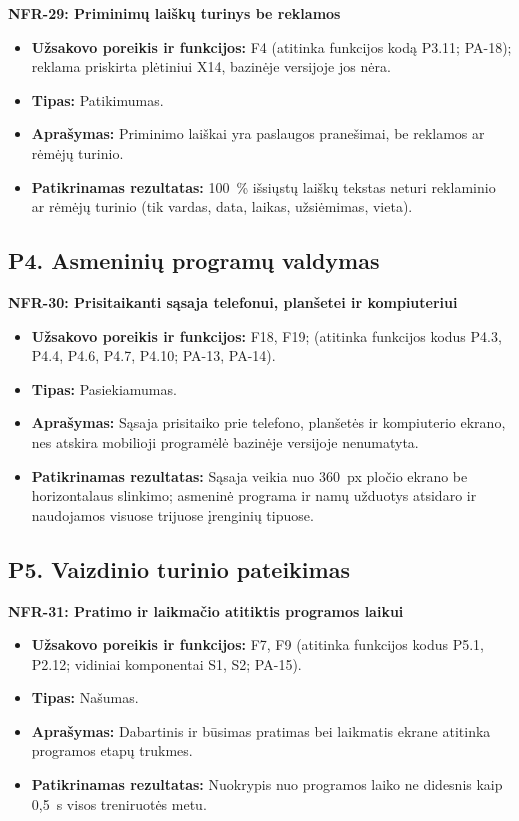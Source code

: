 \noindent\textbf{NFR-29: Priminimų laiškų turinys be reklamos}
\begin{itemize}
    \item \textbf{Užsakovo poreikis ir funkcijos:} F4 (atitinka funkcijos kodą P3.11; PA-18); reklama priskirta plėtiniui X14, bazinėje versijoje jos nėra.
    \item \textbf{Tipas:} Patikimumas.
    \item \textbf{Aprašymas:} Priminimo laiškai yra paslaugos pranešimai, be reklamos ar rėmėjų turinio.
    \item \textbf{Patikrinamas rezultatas:} 100~\% išsiųstų laiškų tekstas neturi reklaminio ar rėmėjų turinio (tik vardas, data, laikas, užsiėmimas, vieta).
\end{itemize}

\subsection{P4. Asmeninių programų valdymas}

\noindent\textbf{NFR-30: Prisitaikanti sąsaja telefonui, planšetei ir kompiuteriui}
\begin{itemize}
    \item \textbf{Užsakovo poreikis ir funkcijos:} F18, F19; (atitinka funkcijos kodus P4.3, P4.4, P4.6, P4.7, P4.10; PA-13, PA-14).
    \item \textbf{Tipas:} Pasiekiamumas.
    \item \textbf{Aprašymas:} Sąsaja prisitaiko prie telefono, planšetės ir kompiuterio ekrano, nes atskira mobilioji programėlė bazinėje versijoje nenumatyta.
    \item \textbf{Patikrinamas rezultatas:} Sąsaja veikia nuo 360~px pločio ekrano be horizontalaus slinkimo; asmeninė programa ir namų užduotys atsidaro ir naudojamos visuose trijuose įrenginių tipuose.
\end{itemize}

\subsection{P5. Vaizdinio turinio pateikimas}

\noindent\textbf{NFR-31: Pratimo ir laikmačio atitiktis programos laikui}
\begin{itemize}
    \item \textbf{Užsakovo poreikis ir funkcijos:} F7, F9 (atitinka funkcijos kodus P5.1, P2.12; vidiniai komponentai S1, S2; PA-15).
    \item \textbf{Tipas:} Našumas.
    \item \textbf{Aprašymas:} Dabartinis ir būsimas pratimas bei laikmatis ekrane atitinka programos etapų trukmes.
    \item \textbf{Patikrinamas rezultatas:} Nuokrypis nuo programos laiko ne didesnis kaip 0,5~s visos treniruotės metu.
\end{itemize}

